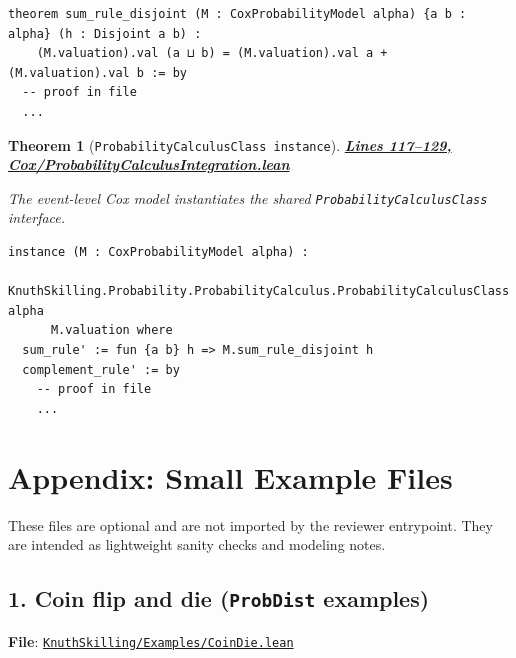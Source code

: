 \documentclass[11pt]{article}
\newtheorem{theorem}{Theorem}[section]
\theoremstyle{definition}
\theoremstyle{remark}
\begin{document}
\begin{lstlisting}[caption={Disjoint additivity derived from Cox rules}]
theorem sum_rule_disjoint (M : CoxProbabilityModel alpha) {a b : alpha} (h : Disjoint a b) :
    (M.valuation).val (a ⊔ b) = (M.valuation).val a + (M.valuation).val b := by
  -- proof in file
  ...
\end{lstlisting}

\begin{theorem}[\texttt{ProbabilityCalculusClass instance}]
\textbf{\href{https://github.com/zariuq/ks-foundations-of-inference/blob/main/ProbabilityTheory/Cox/ProbabilityCalculusIntegration.lean\#L117-L129}{Lines 117--129, Cox/ProbabilityCalculusIntegration.lean}}

The event-level Cox model instantiates the shared \texttt{ProbabilityCalculusClass} interface.
\end{theorem}

\begin{lstlisting}[caption={ProbabilityCalculusClass instance for CoxProbabilityModel}]
instance (M : CoxProbabilityModel alpha) :
    KnuthSkilling.Probability.ProbabilityCalculus.ProbabilityCalculusClass alpha
      M.valuation where
  sum_rule' := fun {a b} h => M.sum_rule_disjoint h
  complement_rule' := by
    -- proof in file
    ...
\end{lstlisting}

\section*{Appendix: Small Example Files}
\label{app:examples}

These files are optional and are not imported by the reviewer entrypoint.  They are intended as
lightweight sanity checks and modeling notes.

\subsection*{1. Coin flip and die (\texttt{ProbDist} examples)}

\textbf{File}: \href{https://github.com/zariuq/ks-foundations-of-inference/blob/main/KnuthSkilling/Examples/CoinDie.lean}{\texttt{KnuthSkilling/Examples/CoinDie.lean}}
\end{document}
